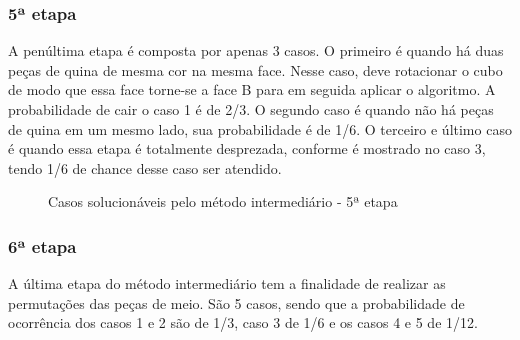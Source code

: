 \subsubsection{5ª etapa}

A penúltima etapa é composta por apenas 3 casos. O primeiro é quando há duas peças de quina de mesma cor na mesma face. Nesse caso, deve rotacionar o cubo de modo que essa face torne-se a face B para em seguida aplicar o algoritmo. A probabilidade de cair o caso 1 é de 2/3. O segundo caso é quando não há peças de quina em um mesmo lado, sua probabilidade é de 1/6. O terceiro e último caso é quando essa etapa é totalmente desprezada, conforme é mostrado no caso 3, tendo 1/6 de chance desse caso ser atendido.

\begin{figure}[!htb]
    \centering
    \quad %
    \quad %
\caption{Casos solucionáveis pelo método intermediário - 5ª etapa}
\label{fig:intermediario5}
\end{figure}

\subsubsection{6ª etapa}

A última etapa do método intermediário tem a finalidade de realizar as permutações das peças de meio. São 5 casos, sendo que a probabilidade de ocorrência dos casos 1 e 2 são de 1/3, caso 3 de 1/6 e os casos 4 e 5 de 1/12.

